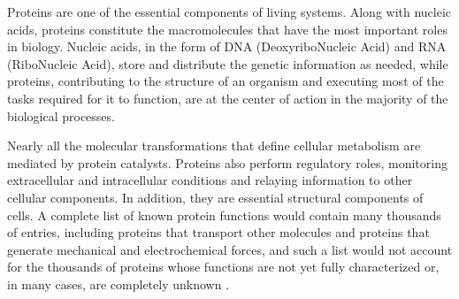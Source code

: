 
Proteins are one of the essential components of living systems. Along with nucleic acids, proteins constitute the macromolecules that have the most important roles in biology. 
Nucleic acids, in the form of DNA (DeoxyriboNucleic Acid) and RNA (RiboNucleic Acid), store and distribute the genetic information as needed, while proteins, contributing to the structure of an organism and executing most of the tasks required for it to function, are at the center of action in the majority of the biological processes.
 
Nearly all the molecular transformations that define cellular metabolism are mediated by protein catalysts. Proteins also perform regulatory roles, monitoring extracellular and intracellular conditions and relaying information to other cellular components. In addition, they are essential structural components of cells.
A complete list of known protein functions would contain many thousands of entries, including proteins that transport other molecules and proteins that generate mechanical and electrochemical forces, and such a list would not account for the thousands of proteins whose functions are not yet fully characterized or, in many cases, are completely unknown
\cite{voet2016fundamentals}.

